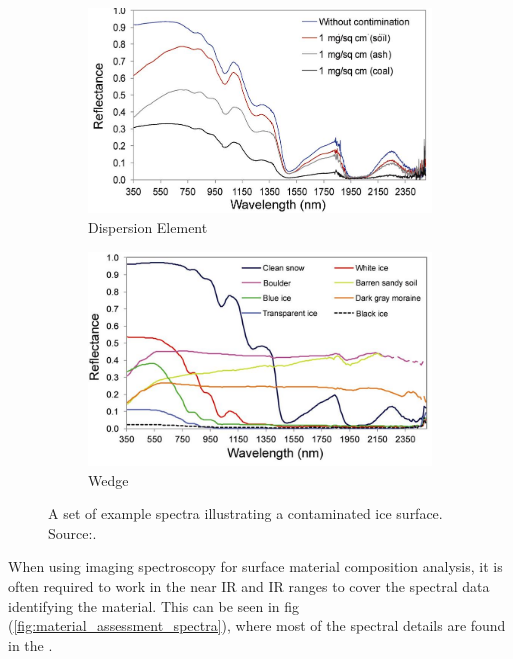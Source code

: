 \begin{figure}[h]
    \centering
    \begin{subfigure}[b]{0.45\textwidth}
        \includegraphics[width=\textwidth]{figures/Orbiter/ice_surface_assessment_spectra_contamination}
        \caption{Dispersion Element}\label{fig:ice_spectra_contamination}
    \end{subfigure}
    \begin{subfigure}[b]{0.45\textwidth}
        \includegraphics[width=\textwidth]{figures/Orbiter/ice_surface_assessment_spectra_feature}
        \caption{Wedge}\label{fig:ice_spectra_feature}
    \end{subfigure}
    \caption{A set of example spectra illustrating a contaminated ice surface. Source:\cite{negi2015a}.}\label{fig:ice_assessment_spectra2}
\end{figure}
When using imaging spectroscopy for surface material composition analysis, it is often required to work in the near IR and IR ranges to cover the spectral data identifying the material. This can be seen in fig (\ref{fig:material_assessment_spectra}), where most of the spectral details are found in the .
